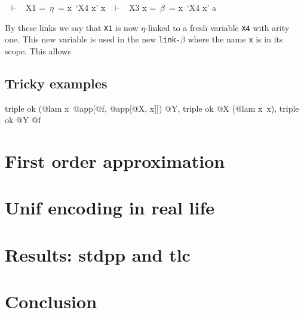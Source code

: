 \documentclass[sigconf,natbib=false,review]{acmart}
\newcommand{\linkbeta}{\texttt{link-}\ensuremath{\beta}\xspace}
\begin{document}
\begin{textcode}
  ~$\vdash$~ X1   =~$\eta$~= x\ `X4 x'
x ~$\vdash$~ X3 x =~$\beta$~= x\ `X4 x' a
\end{textcode}

By these links we say that \texttt{X1} is now $\eta$-linked to a fresh variable
\texttt{X4} with arity one. This new variable is used in the new \linkbeta where
the name \texttt{x} is in its scope. This allows 

\subsection{Tricky examples}

\begin{elpicode}
  triple ok (@lam x\ @app[@f, @app[@X, x]]) @Y,
  triple ok @X (@lam x\ x),
  triple ok @Y @f
\end{elpicode}

\begin{elpicode}
\end{elpicode}

\section{First order approximation}



\section{Unif encoding in real life}

\section{Results: stdpp and tlc}

\section{Conclusion}

\printbibliography

\clearpage


\end{document}
